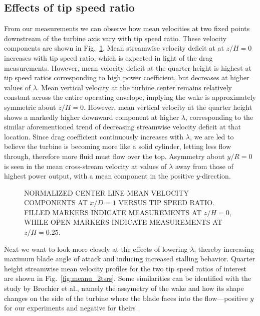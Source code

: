 

\subsection{Effects of tip speed ratio}

From our measurements we can observe how mean velocities at two fixed points
downstream of the turbine axis vary with tip speed ratio. These velocity
components are shown in Fig.~\ref{fig:meanuvstsr}. Mean streamwise velocity
deficit at at $z/H = 0$ increases with tip speed ratio, which is expected in
light of the drag measurements. However, mean velocity deficit at the quarter
height is highest at tip speed ratios corresponding to high power coefficient,
but decreases at higher values of $\lambda$. Mean vertical velocity at the
turbine center remains relatively constant across the entire operating envelope,
implying the wake is approximately symmetric about $z/H = 0$. However, mean
vertical velocity at the quarter height shows a markedly higher downward
component at higher $\lambda$, corresponding to the similar aforementioned trend
of decreasing streamwise velocity deficit at that location. Since drag
coefficient continuously increases with $\lambda$, we are led to believe the
turbine is becoming more like a solid cylinder, letting less flow through,
therefore more fluid must flow over the top. Asymmetry about $y/R=0$ is seen in
the mean cross-stream velocity at values of $\lambda$ away from those of highest
power output, with a mean component in the positive $y$-direction.

\begin{figure}[t]

    \caption{NORMALIZED CENTER LINE MEAN VELOCITY COMPONENTS AT $x/D=1$ VERSUS
        TIP SPEED RATIO. FILLED MARKERS INDICATE MEASUREMENTS AT $z/H=0$, WHILE OPEN
        MARKERS INDICATE MEASUREMENTS AT $z/H=0.25$.}

    \label{fig:meanuvstsr} 
\end{figure}

Next we want to look more closely at the effects of lowering $\lambda$, thereby
increasing maximum blade angle of attack and inducing increased stalling
behavior. Quarter height streamwise mean velocity profiles for the two tip speed
ratios of interest are shown in Fig.~\ref{fig:meanu_2tsrs}. Some similarities
can be identified with the study by Brochier et al., namely the assymetry of the
wake and how its shape changes on the side of the turbine where the blade faces
into the flow---positive $y$ for our experiments and negative for theirs
\cite{brochier86}.

